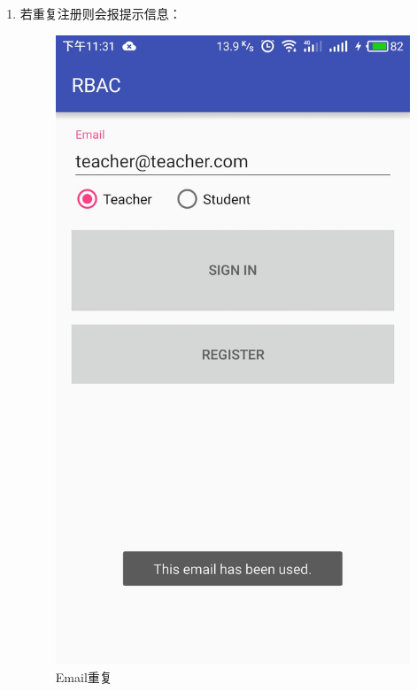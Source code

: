 \begin{itemize}
\begin{enumerate}
\begin{itemize}
\begin{enumerate}
				\item 若重复注册则会报提示信息：
				\begin{figure}[H]
					\centering
					\includegraphics[height=0.39\textheight]{snapshot/4}
					\caption{Email重复}
					\label{fig:4}
				\end{figure}
				

\end{enumerate}
\end{itemize}
\end{enumerate}
\end{itemize}
